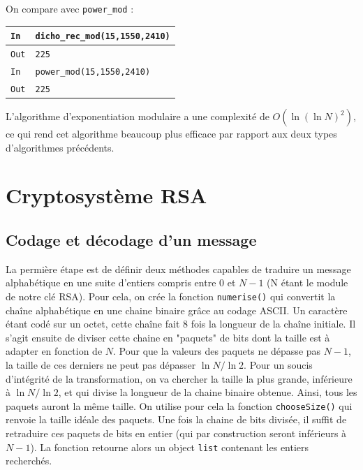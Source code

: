 \documentclass[titlepage]{article}
\begin{document}
    

    On compare avec \texttt{power\_mod} :\bigbreak

    \begin{tabularx}{12cm}{|p{0.60cm}|X|}
        \hline
        \rowcolor{gray}
        \texttt{In}
        & 
        \texttt{dicho\_rec\_mod(15,1550,2410)}
        \\
        \hline
        \texttt{Out}
        &
        \texttt{225}
        \\
        \hline
        \rowcolor{gray}
        \texttt{In}
        & 
        \texttt{power\_mod(15,1550,2410)}
        \\
        \hline
        \texttt{Out}
        &
        \texttt{225}
        \\
        \hline
    \end{tabularx}
    \bigbreak

    L'algorithme d'exponentiation modulaire a une complexité de $O(\ln (\ln N)^2)$, ce qui rend cet algorithme beaucoup plus efficace par rapport aux deux types d'algorithmes précédents.

    \section{Cryptosystème RSA}
    \subsection{Codage et décodage d'un message}
    La permière étape est de définir deux méthodes capables de traduire un message alphabétique en une suite d'entiers compris entre $0$ et $N-1$ (N étant le module de notre clé RSA).
    Pour cela, on crée la fonction \texttt{numerise()} qui convertit la chaîne alphabétique en une chaine binaire grâce au codage ASCII. Un caractère étant codé sur un octet, cette chaîne fait 8 fois la longueur de la chaîne initiale.
    Il s'agit ensuite de diviser cette chaine en "paquets" de bits dont la taille est à adapter en fonction de $N$.
    Pour que la valeurs des paquets ne dépasse pas $N-1$, la taille de ces derniers ne peut pas dépasser $\ln N/ \ln 2$. Pour un soucis d'intégrité de la transformation, on va chercher la taille la plus grande, inférieure à $\ln N/ \ln 2$, et qui divise la longueur de la chaine binaire obtenue.
    Ainsi, tous les paquets auront la même taille. On utilise pour cela la fonction \texttt{chooseSize()} qui renvoie la taille idéale des paquets.
    Une fois la chaine de bits divisée, il suffit de retraduire ces paquets de bits en entier (qui par construction seront inférieurs à $N-1$).
    La fonction retourne alors un object \texttt{list} contenant les entiers recherchés.
\end{document}
